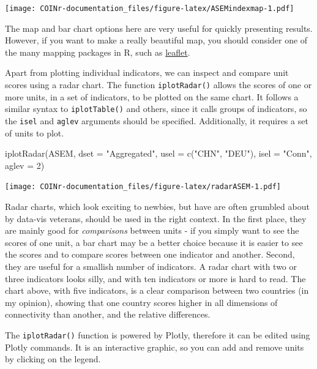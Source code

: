 \documentclass[
]{book}
\newenvironment{Shaded}{\begin{snugshade}}{\end{snugshade}}
\newcommand{\AttributeTok}[1]{\textcolor[rgb]{0.77,0.63,0.00}{#1}}
\newcommand{\DecValTok}[1]{\textcolor[rgb]{0.00,0.00,0.81}{#1}}
\newcommand{\FunctionTok}[1]{\textcolor[rgb]{0.00,0.00,0.00}{#1}}
\newcommand{\NormalTok}[1]{#1}
\newcommand{\StringTok}[1]{\textcolor[rgb]{0.31,0.60,0.02}{#1}}
\begin{document}
\texttt{[image: COINr-documentation\_files/figure-latex/ASEMindexmap-1.pdf]}

The map and bar chart options here are very useful for quickly presenting results. However, if you want to make a really beautiful map, you should consider one of the many mapping packages in R, such as \href{https://rstudio.github.io/leaflet/}{leaflet}.

Apart from plotting individual indicators, we can inspect and compare unit scores using a radar chart. The function \texttt{iplotRadar()} allows the scores of one or more units, in a set of indicators, to be plotted on the same chart. It follows a similar syntax to \texttt{iplotTable()} and others, since it calls groups of indicators, so the \texttt{isel} and \texttt{aglev} arguments should be specified. Additionally, it requires a set of units to plot.

\begin{Shaded}
\begin{Highlighting}[]
\FunctionTok{iplotRadar}\NormalTok{(ASEM, }\AttributeTok{dset =} \StringTok{"Aggregated"}\NormalTok{, }\AttributeTok{usel =} \FunctionTok{c}\NormalTok{(}\StringTok{"CHN"}\NormalTok{, }\StringTok{"DEU"}\NormalTok{), }\AttributeTok{isel =} \StringTok{"Conn"}\NormalTok{, }\AttributeTok{aglev =} \DecValTok{2}\NormalTok{)}
\end{Highlighting}
\end{Shaded}

\texttt{[image: COINr-documentation\_files/figure-latex/radarASEM-1.pdf]}

Radar charts, which look exciting to newbies, but have are often grumbled about by data-vis veterans, should be used in the right context. In the first place, they are mainly good for \emph{comparisons} between units - if you simply want to see the scores of one unit, a bar chart may be a better choice because it is easier to see the scores and to compare scores between one indicator and another. Second, they are useful for a smallish number of indicators. A radar chart with two or three indicators looks silly, and with ten indicators or more is hard to read. The chart above, with five indicators, is a clear comparison between two countries (in my opinion), showing that one country scores higher in all dimensions of connectivity than another, and the relative differences.

The \texttt{iplotRadar()} function is powered by Plotly, therefore it can be edited using Plotly commands. It is an interactive graphic, so you can add and remove units by clicking on the legend.
\end{document}
